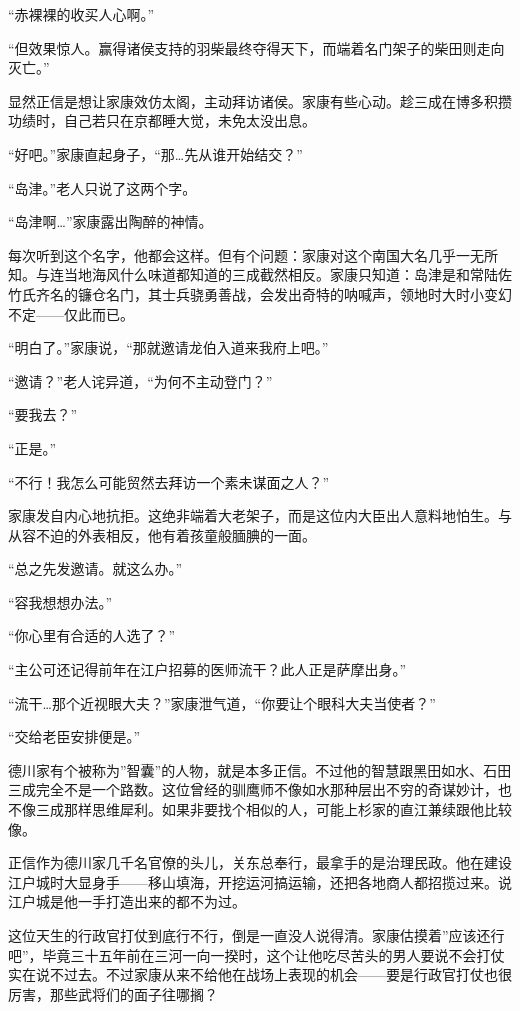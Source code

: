\documentclass[
]{book}
\begin{document}
``赤裸裸的收买人心啊。''

``但效果惊人。赢得诸侯支持的羽柴最终夺得天下，而端着名门架子的柴田则走向灭亡。''

显然正信是想让家康效仿太阁，主动拜访诸侯。家康有些心动。趁三成在博多积攒功绩时，自己若只在京都睡大觉，未免太没出息。

``好吧。''家康直起身子，``那\ldots 先从谁开始结交？''

``岛津。''老人只说了这两个字。

``岛津啊\ldots{}''家康露出陶醉的神情。

每次听到这个名字，他都会这样。但有个问题：家康对这个南国大名几乎一无所知。与连当地海风什么味道都知道的三成截然相反。家康只知道：岛津是和常陆佐竹氏齐名的镰仓名门，其士兵骁勇善战，会发出奇特的呐喊声，领地时大时小变幻不定------仅此而已。

``明白了。''家康说，``那就邀请龙伯入道来我府上吧。''

``邀请？''老人诧异道，``为何不主动登门？''

``要我去？''

``正是。''

``不行！我怎么可能贸然去拜访一个素未谋面之人？''

家康发自内心地抗拒。这绝非端着大老架子，而是这位内大臣出人意料地怕生。与从容不迫的外表相反，他有着孩童般腼腆的一面。

``总之先发邀请。就这么办。''

``容我想想办法。''

``你心里有合适的人选了？''

``主公可还记得前年在江户招募的医师流干？此人正是萨摩出身。''

``流干\ldots 那个近视眼大夫？''家康泄气道，``你要让个眼科大夫当使者？''

``交给老臣安排便是。''

德川家有个被称为''智囊''的人物，就是本多正信。不过他的智慧跟黑田如水、石田三成完全不是一个路数。这位曾经的驯鹰师不像如水那种层出不穷的奇谋妙计，也不像三成那样思维犀利。如果非要找个相似的人，可能上杉家的直江兼续跟他比较像。

正信作为德川家几千名官僚的头儿，关东总奉行，最拿手的是治理民政。他在建设江户城时大显身手------移山填海，开挖运河搞运输，还把各地商人都招揽过来。说江户城是他一手打造出来的都不为过。

这位天生的行政官打仗到底行不行，倒是一直没人说得清。家康估摸着''应该还行吧''，毕竟三十五年前在三河一向一揆时，这个让他吃尽苦头的男人要说不会打仗实在说不过去。不过家康从来不给他在战场上表现的机会------要是行政官打仗也很厉害，那些武将们的面子往哪搁？
\end{document}
